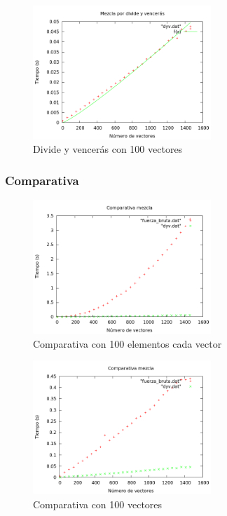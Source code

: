 \begin{figure}[htb] 
\centering
	\includegraphics[width=0.6\textwidth]{../Obligatorio/Graficas/dyv_nelementos.png}
	\caption{Divide y vencerás con 100 vectores} 
	\label{fig:d_nelementos} 
\end{figure}
\newpage

\subsubsection{Comparativa}
\begin{figure}[htb] 
\centering
	\includegraphics[width=0.6\textwidth]{../Obligatorio/Graficas/comparativa_kvectores.png}
	\caption{Comparativa con 100 elementos cada vector} 
	\label{fig:comp_kvectores} 
\end{figure}

\begin{figure}[htb] 
\centering
	\includegraphics[width=0.6\textwidth]{../Obligatorio/Graficas/comparativa_nelementos.png}
	\caption{Comparativa con 100 vectores} 
	\label{fig:comp_nelementos} 
\end{figure}
\newpage



